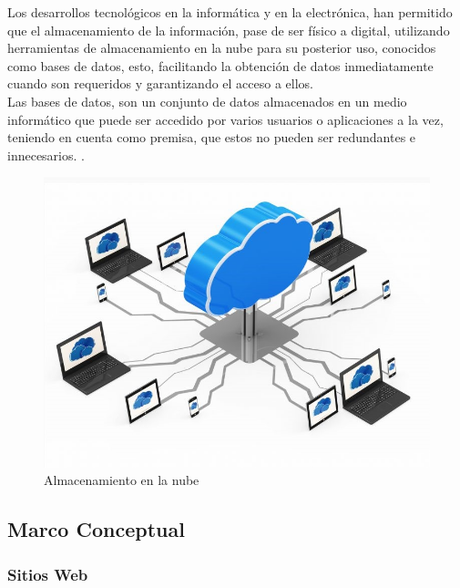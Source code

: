 		{Los desarrollos tecnológicos en la informática y en la electrónica, han permitido que el almacenamiento de la información, pase de ser físico a digital, utilizando herramientas de almacenamiento en la nube para su posterior uso, conocidos como bases de datos, esto, facilitando la obtención de datos inmediatamente cuando son requeridos y garantizando el acceso a ellos.\\
			
		Las bases de datos, son un conjunto de datos almacenados en un medio informático que puede ser accedido por varios usuarios o aplicaciones a la vez, teniendo en cuenta como premisa, que estos no pueden ser redundantes e innecesarios.  \cite{angelData}.\\
		
		\begin{figure}[H]
			\centering
			\includegraphics[width=0.8\linewidth]{description/framework/nube.jpg}
			\caption{Almacenamiento en la nube}
		\end{figure}
	}
		
	
	\subsection{Marco Conceptual}
	
		\subsubsection{Sitios Web}
		
